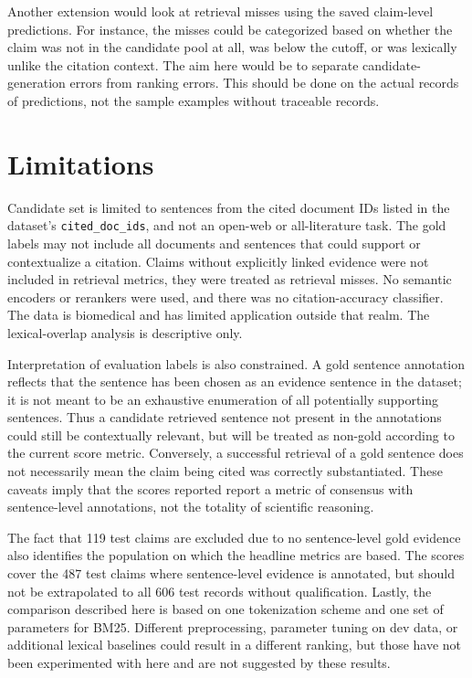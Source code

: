 \documentclass[11pt]{article}
\begin{document}
Another extension would look at retrieval misses using the saved claim-level predictions. For instance, the misses could be categorized based on whether the claim was not in the candidate pool at all, was below the cutoff, or was lexically unlike the citation context. The aim here would be to separate candidate-generation errors from ranking errors. This should be done on the actual records of predictions, not the sample examples without traceable records.

\section{Limitations}
Candidate set is limited to sentences from the cited document IDs listed in the dataset's \texttt{cited\_doc\_ids}, and not an open-web or all-literature task. The gold labels may not include all documents and sentences that could support or contextualize a citation. Claims without explicitly linked evidence were not included in retrieval metrics, they were treated as retrieval misses. No semantic encoders or rerankers were used, and there was no citation-accuracy classifier. The data is biomedical and has limited application outside that realm. The lexical-overlap analysis is descriptive only.

Interpretation of evaluation labels is also constrained. A gold sentence annotation reflects that the sentence has been chosen as an evidence sentence in the dataset; it is not meant to be an exhaustive enumeration of all potentially supporting sentences. Thus a candidate retrieved sentence not present in the annotations could still be contextually relevant, but will be treated as non-gold according to the current score metric. Conversely, a successful retrieval of a gold sentence does not necessarily mean the claim being cited was correctly substantiated. These caveats imply that the scores reported report a metric of consensus with sentence-level annotations, not the totality of scientific reasoning.

The fact that 119 test claims are excluded due to no sentence-level gold evidence also identifies the population on which the headline metrics are based. The scores cover the 487 test claims where sentence-level evidence is annotated, but should not be extrapolated to all 606 test records without qualification. Lastly, the comparison described here is based on one tokenization scheme and one set of parameters for BM25. Different preprocessing, parameter tuning on dev data, or additional lexical baselines could result in a different ranking, but those have not been experimented with here and are not suggested by these results.
\end{document}

